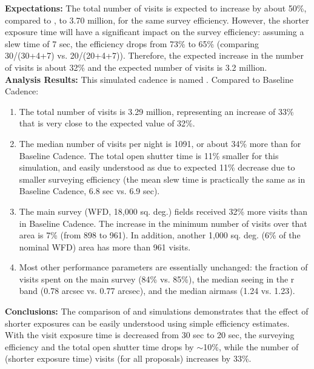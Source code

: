 {\bf Expectations:} The total number of visits is expected to increase
by about 50\%, compared to , to 3.70 million,
for the same survey efficiency. However, the shorter exposure time
will have a significant impact on the survey efficiency: assuming a
slew time of 7 sec, the efficiency drops from 73\% to 65\% (comparing
30/(30+4+7) vs. 20/(20+4+7)). Therefore, the expected increase in the
number of visits is about 32\% and the expected number of visits is
3.2 million.  \\

{\bf Analysis Results:}  This simulated cadence is named
. Compared to Baseline Cadence:
\begin{enumerate}
\item The total number of visits is 3.29 million, representing an
increase of 33\% that is very close to the expected value of 32\%.
\item The median number of visits per night is 1091, or about 34\%
more than for Baseline Cadence. The total open shutter time is 11\%
smaller for this simulation, and easily understood as due to expected
11\% decrease due to smaller surveying efficiency (the mean slew time
is practically the same as in Baseline Cadence, 6.8 sec vs. 6.9 sec).
\item The main survey (WFD, 18,000 sq. deg.) fields received 32\% more
visits than in Baseline Cadence. The increase in the minimum number of
visits over that area is 7\% (from 898 to 961). In addition, another
1,000 sq. deg. (6\% of the nominal WFD) area has more than 961 visits.
\item Most other performance parameters are essentially unchanged: the
fraction of visits spent on the main survey (84\% vs. 85\%), the
median seeing in the r band (0.78 arcsec vs. 0.77 arcsec), and the
median airmass (1.24 vs. 1.23).
\end{enumerate}

{\bf Conclusions:}
The comparison of  and
 simulations demonstrates that the effect of
shorter exposures can be easily understood using simple efficiency
estimates. With the visit exposure time is decreased from 30 sec to 20
sec, the surveying efficiency and the total open shutter time drops by
$\sim$10\%, while the number of (shorter exposure time) visits (for
all proposals) increases by 33\%.




